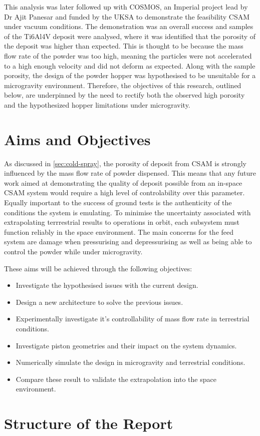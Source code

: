 This analysis was later followed up with COSMOS, an Imperial project lead by Dr Ajit Panesar and funded by the UKSA to demonstrate the feasibility CSAM under vacuum conditions. The demonstration was an overall success and samples of the Ti6Al4V deposit were analysed, where it was identified that the porosity of the deposit was higher than expected. This is thought to be because the mass flow rate of the powder was too high, meaning the particles were not accelerated to a high enough velocity and did not deform as expected. Along with the sample porosity, the design of the powder hopper was hypothesised to be unsuitable for a microgravity environment. Therefore, the objectives of this research, outlined below, are underpinned by the need to rectify both the observed high porosity and the hypothesized hopper limitations under microgravity.

\section{Aims and Objectives}
As discussed in \autoref{sec:cold-spray}, the porosity of deposit from CSAM is strongly influenced by the mass flow rate of powder dispensed. This means that any future work aimed at demonstrating the quality of deposit possible from an in-space CSAM system would require a high level of controlability over this parameter. Equally important to the success of ground tests is the authenticity of the conditions the system is emulating. To minimise the uncertainty associated with extrapolating terrrestrial results to operations in orbit, each subsystem must function reliably in the space environment. The main concerns for the feed system are damage when pressurising and depressurising as well as being able to control the powder while under microgravity.

These aims will be achieved through the following objectives:
\begin{itemize}
    \item Investigate the hypothesised issues with the current design.
    \item Design a new architecture to solve the previous issues.
    \item Experimentally investigate it's controllability of mass flow rate in terrestrial conditions.
    \item Investigate piston geometries and their impact on the system dynamics.
    \item Numerically simulate the design in microgravity and terrestrial conditions.
    \item Compare these result to validate the extrapolation into the space environment. 
\end{itemize}


\section{Structure of the Report}
